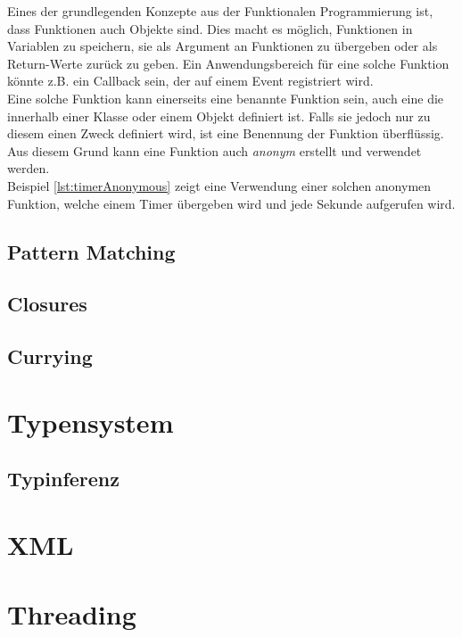 Eines der grundlegenden Konzepte aus der Funktionalen Programmierung ist,
dass Funktionen auch Objekte sind. Dies macht es möglich, Funktionen
in Variablen zu speichern, sie als Argument an Funktionen zu übergeben
oder als Return-Werte zurück zu geben. Ein Anwendungsbereich für eine
solche Funktion könnte z.B. ein Callback sein, der auf einem Event
registriert wird.\\

Eine solche Funktion kann einerseits eine benannte Funktion sein,
auch eine die innerhalb einer Klasse oder einem Objekt definiert ist.
Falls sie jedoch nur zu diesem einen Zweck definiert wird, ist eine 
Benennung der Funktion überflüssig. Aus diesem Grund kann eine Funktion
auch \emph{anonym} erstellt und verwendet werden.\\

Beispiel \ref{lst:timerAnonymous} zeigt eine Verwendung einer solchen 
anonymen Funktion, welche einem Timer übergeben wird und jede Sekunde
aufgerufen wird. \\


\subsection{Pattern Matching}

\subsection{Closures}

\subsection{Currying}

\section{Typensystem}

\subsection{Typinferenz}

\section{XML}

\section{Threading}
